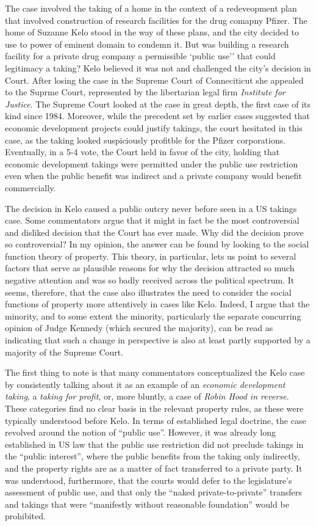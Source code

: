 The case involved the taking of a home in the context of a redeveopment plan that involved construction of research facilities for the drug comapny Pfizer. The home of Suzanne Kelo stood in the way of these plans, and the city decided to use to power of eminent domain to condemn it. But was building a research facility for a private drug company a permissible  `public use'' that could legitimacy a taking? Kelo believed it was not and challenged the city's decision in Court. After losing the case in the Supreme Court of Conneciticut she appealed to the Suprme Court, represented by the libertarian legal firm {\it Institute for Justice}. The Supreme Court looked at the case in great depth, the first case of its kind since 1984.  Moreover, while the precedent set by earlier cases suggested that economic development projects could justify takings, the court hesitated in this case, as the taking looked suspiciously profitble for the Pfizer corporations. Eventually, in a 5-4 vote, the Court held in favor of the city, holding that economic development takings were permitted under the public use restriction even when the public benefit was indirect and a private company would benefit commercially.

The decision in Kelo caused a public outcry never before seen in a US takings case. Some commentators argue that it might in fact be the most controversial and disliked decision that the Court has ever made. Why did the decision prove so controversial? In my opinion, the answer can be found by looking to the social function theory of property. This theory, in particular, lets us point to several factors that serve as plausible reasons for why the decision attracted so much negative attention and was so badly received across the political spectrum. It seems, therefore, that the case also illustrates the need to consider the social functions of property more attentively in cases like Kelo. Indeed, I argue that the minority, and to some extent the minority, particularly the separate concurring opinion of Judge Kennedy (which secured the majority), can be read as indicating that such a change in perspective is also at least partly supported by a majority of the Supreme Court. 

The first thing to note is that many commentators conceptualized the Kelo case by consistently talking about it as an example of an {\it economic development taking}, a {\it taking for profit}, or, more bluntly, a case of {\it Robin Hood in reverse}. These categories find no clear basis in the relevant property rules, as these were typically understood before Kelo. In terms of established legal doctrine, the case revolved around the notion of ``public use''. However, it was already long established in US law that the public use restriction did not preclude takings in the ``public interest'', where the public benefits from the taking only indirectly, and the property rights are as a matter of fact transferred to a private party. It was understood, furthermore, that the courts would defer to the legislature's assessment of public use, and that only the ``naked private-to-private'' transfers and takings that were ``manifestly without reasonable foundation'' would be prohibited. 

